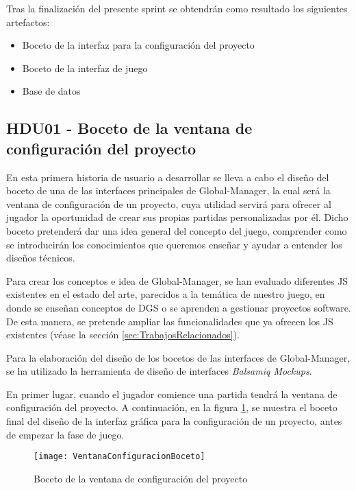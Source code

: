Tras la finalización del presente sprint se obtendrán como resultado los siguientes artefactos:
\begin{itemize}
	\item Boceto de la interfaz para la configuración del proyecto
	\item Boceto de la interfaz de juego
	\item Base de datos
\end{itemize}

\subsection{HDU01 - Boceto de la ventana de configuración del proyecto}
\label{sec:HDU01}

En esta primera historia de usuario a desarrollar se lleva a cabo el diseño del boceto de una de las interfaces principales de Global-Manager, la cual será la ventana de configuración de un proyecto, cuya utilidad servirá para ofrecer al jugador la oportunidad de crear sus propias partidas personalizadas por él. Dicho boceto pretenderá dar una idea general del concepto del juego, comprender como se introducirán los conocimientos que queremos enseñar y ayudar a entender los diseños técnicos.

Para crear los conceptos e idea de Global-Manager, se han evaluado diferentes JS existentes en el estado del arte, parecidos a la temática de nuestro juego, en donde se enseñan conceptos de DGS o se aprenden a gestionar proyectos software. De esta manera, se pretende ampliar las funcionalidades que ya ofrecen los JS existentes (véase la sección \ref{sec:TrabajosRelacionados}).

Para la elaboración del diseño de los bocetos de las interfaces de Global-Manager, se ha utilizado la herramienta de diseño de interfaces \emph{Balsamiq Mockups}.

En primer lugar, cuando el jugador comience una partida tendrá la ventana de configuración del proyecto. A continuación, en la figura \ref{fig:VentanaConfiguracionBoceto}, se muestra el boceto final del diseño de la interfaz gráfica para la configuración de un proyecto, antes de empezar la fase de juego.

\begin{figure}[htb]
	\centering
	\texttt{[image: VentanaConfiguracionBoceto]}
	\caption[Boceto de la ventana de configuración del proyecto]{Boceto de la ventana de configuración del proyecto}
	\label{fig:VentanaConfiguracionBoceto}
\end{figure}

